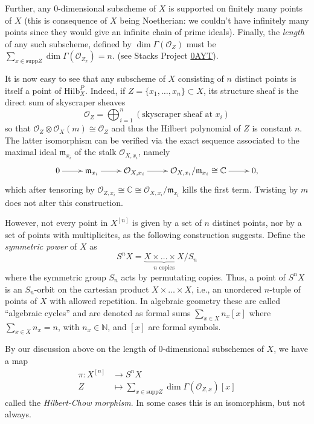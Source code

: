 Further, any 0-dimensional subscheme of $X$
is supported on finitely many points of $X$
(this is consequence of $X$ being Noetherian:
we couldn't have infinitely many points
since they
would give an infinite chain of prime
ideals).
Finally, the {\it length} of any such
subscheme, defined by
 $\dim\Gamma(\mathcal{O}_Z)$
must be $\sum_{x \in \text{supp}
Z}\dim\Gamma(\mathcal{O}_{Z_x})=n$.
(see Stacks Project
\href{https://stacks.math.columbia.edu/tag/0AYT}{0AYT}).

\medskip\noindent
It is now easy to see that any subscheme of
$X$ consisting of $n$ distinct
points is itself a point of
$\text{Hilb}_X^P$.
Indeed, if $Z=\{x_1,\ldots,x_n\}\subset X$,
its
structure sheaf is the direct sum of
skyscraper sheaves
$$
\mathcal{O}_Z=\bigoplus_{i=1}^n
(\text{skyscraper sheaf at $x_i$})
$$
so that $\mathcal{O}_Z \otimes
\mathcal{O}_X(m)\cong\mathcal{O}_Z$
and thus the Hilbert polynomial of $Z$ is
constant $n$.
The latter isomorphism can be verified via
the exact sequence associated to the maximal
ideal
$\mathfrak{m}_{x_i}$
of the stalk $\mathcal{O}_{X,x_i}$, namely
$$
\xymatrix{
0\ar[r]
&\mathfrak{m}_{x_i}\ar[r]
&\mathcal{O}_{X,x_i}\ar[r]
&\mathcal{O}_{X,x_i}/\mathfrak{m}_{x_i}\cong\mathbb{C}\ar[r]
&0,
}
$$
which after tensoring by
$\mathcal{O}_{Z,x_i}
\cong\mathbb{C}\cong\mathcal{O}_{X,x_i}/\mathfrak{m}_{x_i}$
kills the first term.
Twisting by $m$ does not alter this
construction.

\medskip\noindent
However, not every point in $X^{[n]}$ is
given
by a set of $n$ distinct points,
nor by a set of points with multiplicites,
as the following construction suggests.
Define the {\it symmetric power} of $X$ as
$$
S^nX=\underbrace{X \times \ldots \times
X}_{n\text{ copies}}/S_n
$$
where the symmetric group $S_n$ acts by
permutating copies. Thus, a point of $S^nX$
is
an $S_n$-orbit on the cartesian product $X
\times \ldots \times X$,
i.e., an unordered $n$-tuple of points of $X$
with allowed repetition.
In algebraic geometry these are called
``algebraic cycles''
and are denoted as formal sums $\sum_{x \in
X}n_x[x]$
where $\sum_{x \in X}n_x=n$, with $n_x \in
\mathbb{N}$,
and $[x]$ are formal symbols.

By our discussion above on the length of
0-dimensional subschemes of $X$,
we have a map
$$
\begin{aligned}
\pi : X^{[n]} &\longrightarrow S^nX \\
 Z&\longmapsto \sum_{x \in \text{supp}Z}\dim
\Gamma(\mathcal{O}_{Z,x})[x]
\end{aligned}
$$
called the {\it Hilbert-Chow morphism}.
In some cases this is an isomorphism, but
not always.

